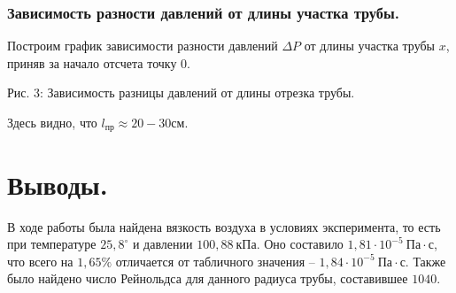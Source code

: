 \documentclass[a4paper,11pt]{article}
\begin{document}
\subsubsection{Зависимость разности давлений от длины участка трубы.}
Построим график зависимости разности давлений $\Delta P$ от длины участка трубы $x$, приняв за начало отсчета точку 0.
\begin{center}
\newline
Рис. 3: Зависимость разницы давлений от длины отрезка трубы.
\end{center}
Здесь видно, что $l_{пр} \approx 20 - 30 см$.
\section{Выводы.}
В ходе работы была найдена вязкость воздуха в условиях эксперимента, то есть при температуре $25,8^{\circ}$ и давлении $100,88\ кПа$. Оно составило $1,81 \cdot 10^{-5}\ Па \cdot с$, что всего на $1,65\%$ отличается от табличного значения -- $1,84 \cdot 10^{-5}\ Па \cdot с$. Также было найдено число Рейнольдса для данного радиуса трубы, составившее $1040$.
\end{document}
